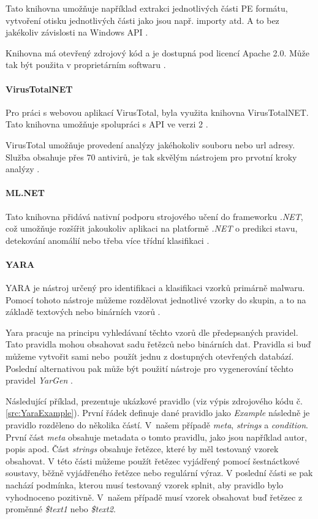 Tato knihovna umožňuje například extrakci jednotlivých části PE formátu, vytvoření otisku jednotlivých části jako jsou např. importy atd. A to bez jakékoliv závislosti na Windows API \cite{github_penet}. 

Knihovna má otevřený zdrojový kód a je dostupná pod licencí Apache 2.0. Může tak být použita v proprietárním softwaru \cite{github_penet}.

\paragraph*{VirusTotalNET}
\label{virustotal_lib}

Pro práci s webovou aplikací VirusTotal, byla využita knihovna VirusTotalNET. Tato knihovna umožňuje spolupráci s API ve verzi 2 \cite{virustotal_net_lib}. 

VirusTotal umožňuje provedení analýzy jakéhokoliv souboru nebo url adresy. Služba obsahuje přes 70 antivirů, je tak skvělým nástrojem pro prvotní kroky analýzy \cite{virustotal_about}.

\paragraph*{ML.NET}
\label{ml_net}
Tato knihovna přidává nativní podporu strojového učení do frameworku \emph{.NET}, což umožňuje rozšířit jakoukoliv aplikaci na platformě \emph{.NET} o predikci stavu, detekování anomálií nebo třeba více třídní klasifikaci \cite{microsoft_mlnet}.


\paragraph*{YARA}

YARA je nástroj určený pro identifikaci a klasifikaci vzorků primárně malwaru. Pomocí tohoto nástroje můžeme rozdělovat jednotlivé vzorky do skupin, a to na základě textových nebo binárních vzorů \cite{virustotal_yara}. 

Yara pracuje na principu vyhledávaní těchto vzorů dle předepsaných pravidel. Tato pravidla mohou obsahovat sadu řetězců nebo binárních dat. Pravidla si buď můžeme vytvořit sami nebo~použít jednu z dostupných otevřených databází. Poslední alternativou pak může být použití nástroje pro vygenerování těchto pravidel \emph{YarGen} \cite{Github_YaraGenerator}.

Následující příklad, prezentuje ukázkové pravidlo (viz výpis zdrojového kódu č. \ref{src:YaraExample}). První řádek definuje dané pravidlo jako \emph{Example} následně je pravidlo rozděleno do několika částí. V~našem případě \emph{meta}, \emph{strings} a \emph{condition}. První část \emph{meta} obsahuje metadata o tomto pravidlu, jako jsou například autor, popis apod. Část \emph{strings} obsahuje řetězce, které by měl testovaný vzorek obsahovat. V této části můžeme použít řetězec vyjádřený pomocí šestnáctkové soustavy, běžně vyjádřeného řetězce nebo regulární výraz. V poslední části se pak nachází podmínka, kterou musí testovaný vzorek splnit, aby pravidlo bylo vyhodnoceno pozitivně. V~našem případě musí vzorek obsahovat buď řetězec z proměnné \emph{\$text1} nebo \emph{\$text2}.

